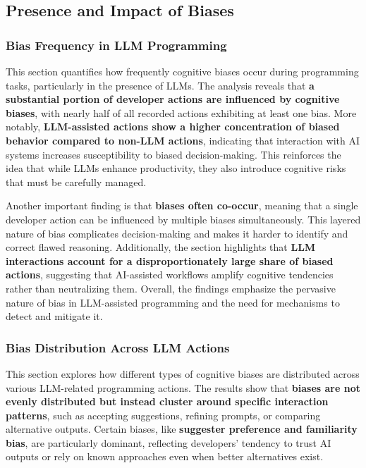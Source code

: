 \subsection{Presence and Impact of Biases}
\subsubsection{Bias Frequency in LLM Programming}
This section quantifies how frequently cognitive biases occur during programming tasks, particularly in the presence of LLMs. The analysis reveals that \textbf{a substantial portion of developer actions are influenced by cognitive biases}, with nearly half of all recorded actions exhibiting at least one bias. More notably, \textbf{LLM-assisted actions show a higher concentration of biased behavior compared to non-LLM actions}, indicating that interaction with AI systems increases susceptibility to biased decision-making. This reinforces the idea that while LLMs enhance productivity, they also introduce cognitive risks that must be carefully managed.

Another important finding is that \textbf{biases often co-occur}, meaning that a single developer action can be influenced by multiple biases simultaneously. This layered nature of bias complicates decision-making and makes it harder to identify and correct flawed reasoning. Additionally, the section highlights that \textbf{LLM interactions account for a disproportionately large share of biased actions}, suggesting that AI-assisted workflows amplify cognitive tendencies rather than neutralizing them. Overall, the findings emphasize the pervasive nature of bias in LLM-assisted programming and the need for mechanisms to detect and mitigate it.

\subsubsection{Bias Distribution Across LLM Actions}
This section explores how different types of cognitive biases are distributed across various LLM-related programming actions. The results show that \textbf{biases are not evenly distributed but instead cluster around specific interaction patterns}, such as accepting suggestions, refining prompts, or comparing alternative outputs. Certain biases, like \textbf{suggester preference and familiarity bias}, are particularly dominant, reflecting developers’ tendency to trust AI outputs or rely on known approaches even when better alternatives exist.

